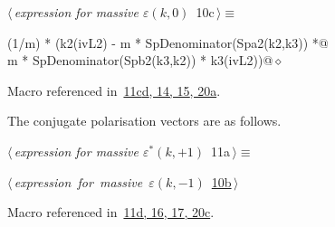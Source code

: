 \documentclass[a4paper,12pt]{amsart}
\renewcommand{\NWtarget}[2]{\hypertarget{#1}{#2}}
\renewcommand{\NWlink}[2]{\hyperlink{#1}{#2}}
\renewcommand{\NWtxtMacroRefIn}{Macro referenced in}
\renewcommand{\NWsep}{${\diamond}$}
\begin{document}
\begin{flushleft} \small
\begin{minipage}{\linewidth}\label{scrap26}\raggedright\small
\NWtarget{nuweb10c}{} $\langle\,${\itshape expression for massive $\varepsilon(k, 0)$}\nobreak\ {\footnotesize {10c}}$\,\rangle\equiv$
\vspace{-1ex}
\begin{list}{}{} \item
\mbox{}\verb@(1/m) * (k2(ivL2) - m * SpDenominator(Spa2(k2,k3)) *@\\
\mbox{}\verb@   m * SpDenominator(Spb2(k3,k2)) * k3(ivL2))@{\NWsep}
\end{list}
\vspace{-1.5ex}
\footnotesize
\begin{list}{}{\setlength{\itemsep}{-\parsep}\setlength{\itemindent}{-\leftmargin}}
\item \NWtxtMacroRefIn\ \NWlink{nuweb11c}{11c}\NWlink{nuweb11d}{d}\NWlink{nuweb14}{, 14}\NWlink{nuweb15}{, 15}\NWlink{nuweb20a}{, 20a}.

\item{}
\end{list}
\end{minipage}\vspace{4ex}
\end{flushleft}
The conjugate polarisation vectors are as follows.
\begin{flushleft} \small
\begin{minipage}{\linewidth}\label{scrap27}\raggedright\small
\NWtarget{nuweb11a}{} $\langle\,${\itshape expression for massive $\varepsilon^\ast(k, +1)$}\nobreak\ {\footnotesize {11a}}$\,\rangle\equiv$
\vspace{-1ex}
\begin{list}{}{} \item
\mbox{}\verb@@\hbox{$\langle\,${\itshape expression for massive $\varepsilon(k, -1)$}\nobreak\ {\footnotesize \NWlink{nuweb10b}{10b}}$\,\rangle$}\verb@@{\NWsep}
\end{list}
\vspace{-1.5ex}
\footnotesize
\begin{list}{}{\setlength{\itemsep}{-\parsep}\setlength{\itemindent}{-\leftmargin}}
\item \NWtxtMacroRefIn\ \NWlink{nuweb11d}{11d}\NWlink{nuweb16}{, 16}\NWlink{nuweb17}{, 17}\NWlink{nuweb20c}{, 20c}.

\item{}
\end{list}
\end{minipage}\vspace{4ex}
\end{flushleft}
\end{document}
